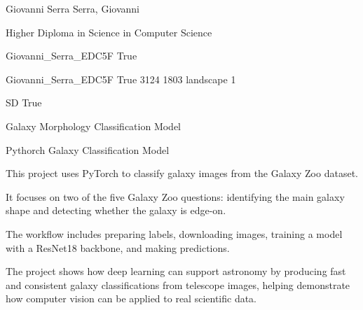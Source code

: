 \documentclass[twoside]{report}
\begin{document}
\begingroup{}\relax



\def\Key{Giovanni_Serra_EDC5F}

{Giovanni Serra}
{Serra, Giovanni}

{Higher Diploma in Science in Computer Science}

{Giovanni_Serra_EDC5F}
{True}

{Giovanni_Serra_EDC5F}
{True}
{3124}
{1803}
{landscape}
{1}

{SD}
{True}

{Galaxy Morphology Classification Model}

{Pythorch Galaxy Classification Model}

{This project uses PyTorch to classify galaxy images from the Galaxy Zoo dataset.

It focuses on two of the five Galaxy Zoo questions: identifying the main galaxy shape and detecting whether the galaxy is edge-on.

The workflow includes preparing labels, downloading images, training a model with a ResNet18 backbone, and making predictions.

The project shows how deep learning can support astronomy by producing fast and consistent galaxy classifications from telescope images, helping demonstrate how computer vision can be applied to real scientific data.}
\end{document}

